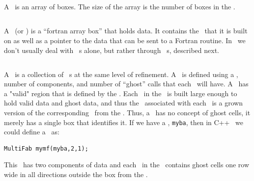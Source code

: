 \subsection{\BoxArray}

A \BoxArray\ is an array of boxes.   The size of the array is the 
number of boxes in the \BoxArray.

\subsection{\FArrayBox}

A \FArrayBox\ (or \Fab) is a ``fortran array box'' that holds data.  It contains the
\BoxType\ that it is built on as well as a pointer to the data 
that can be sent to a Fortran routine.  In \BoxLib\, we don't usually deal with 
\Fab~s alone, but rather
through \MultiFab~s, described next.

\subsection{\MultiFab}

A \MultiFab\ is a collection of \Fab~s at the same level of
refinement.  A \MultiFab\ is defined using a \BoxArray,
number of components, and number of ``ghost'' calls that each \Fab\
will have.  A \MultiFab\ has a "valid" region that is defined by 
the \BoxArray.  Each \Fab\ in the \MultiFab\ is built large enough 
to hold valid data and ghost data, and thus the \BoxType\ associated with
each \Fab\ is a grown version of the corresponding \BoxType\ from the \BoxArray.
Thus, a \Fab\ has no concept 
of ghost cells, it merely has a single box that identifies it.  
If we have a \BoxArray, {\tt myba}, then in C++ \BoxLib\ we could 
define a \MultiFab\ as:
\begin{verbatim}
MultiFab mymf(myba,2,1);
\end{verbatim}
This \MultiFab\ has two components of data and each \Fab\ in the \MultiFab\ contains 
ghost cells one row wide in all directions outside the box from the \BoxArray.

